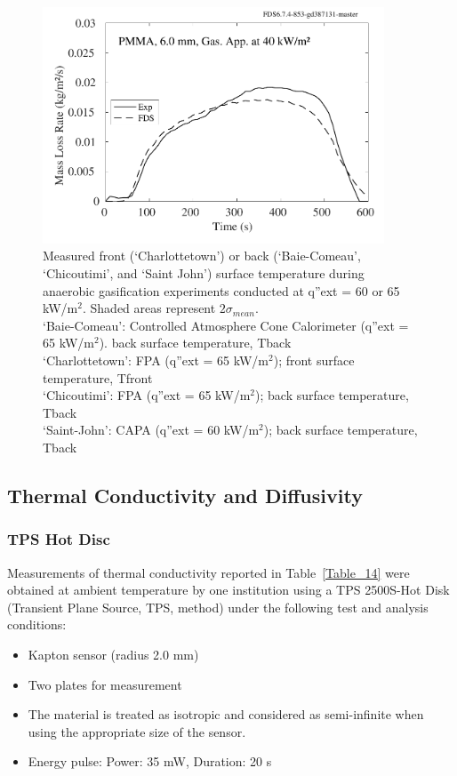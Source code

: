 \documentclass{book}
\begin{document}
\begin{figure}
  \centering
  \includegraphics[width=4in]{SCRIPT_FIGURES/PMMA_40}
  \caption{Measured front (‘Charlottetown’) or back (‘Baie-Comeau’, ‘Chicoutimi’, and ‘Saint John’) surface temperature during anaerobic gasification experiments conducted at q”ext = 60 or 65 kW/m$^2$. Shaded areas represent $2\sigma_{mean}$. \\
 ‘Baie-Comeau’:  Controlled Atmosphere Cone Calorimeter (q”ext = 65 kW/m$^2$). back surface temperature, Tback \\
‘Charlottetown’:  FPA (q”ext = 65 kW/m$^2$); front surface temperature, Tfront \\
‘Chicoutimi’:   FPA (q”ext = 65 kW/m$^2$); back surface temperature, Tback \\
‘Saint-John’:   CAPA (q”ext = 60 kW/m$^2$); back surface temperature, Tback}
  \label{Fig_28}
\end{figure}


\subsection{Thermal Conductivity and Diffusivity}

\subsubsection{TPS Hot Disc}

Measurements of thermal conductivity reported in Table~\ref{Table_14} were obtained at ambient temperature by one institution using a TPS 2500S-Hot Disk (Transient Plane Source, TPS, method) under the following test and analysis conditions:
\begin{itemize}
 \item Kapton sensor (radius 2.0 mm)
 \item Two plates for measurement
 \item The material is treated as isotropic and considered as semi-infinite when using the appropriate size of the sensor.
 \item Energy pulse: Power: 35 mW, Duration: 20 s
\end{itemize}
\end{document}
